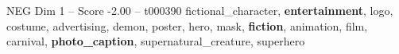 \begin{textsample}{NEG Dim 1 – Score -2.00 – t000390}  \label{ex:f1_neg_015}
fictional\_character, \textbf{entertainment}, logo, costume, advertising, demon, poster, hero, mask, \textbf{fiction}, animation, film, carnival, \textbf{photo\_caption}, supernatural\_creature, superhero

\end{textsample}
